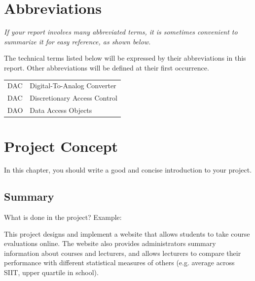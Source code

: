 \documentclass[12pt, a4paper]{report}
\begin{document}
\chapter*{Abbreviations}

\emph{If your report involves many abbreviated terms, it is sometimes convenient to summarize it for easy reference, as shown below.}

\vspace{0.5cm}

\noindent The technical terms listed below will be expressed by their abbreviations in this report. Other abbreviations will be defined at their first occurrence.
\vspace{0.5cm}
\begin{flushleft}
\begin{tabular}[hbtp]{ll}
   {DAC}        &   {Digital-To-Analog Converter} \\
   {DAC}       &   {Discretionary Access Control} \\
   {DAO}       &   {Data Access Objects} \\
\end{tabular}
\end{flushleft}

\newpage

\listoffigures


\newpage
\thispagestyle{empty}
\setcounter{chapter}{0}
\setcounter{section}{0}
\def\thechapter{\arabic{chapter}}

%

\chapter{Project Concept}

In this chapter, you should write a good and concise introduction to your project. 

\section{Summary}
\label{sec:summary}
What is  done in the project?  Example:

This project designs and implement a website that allows students to take course evaluations online. The website also provides administrators summary information about courses and lecturers, and allows lecturers to compare their performance with different statistical measures of others (e.g. average across SIIT, upper quartile in school).
\end{document}
